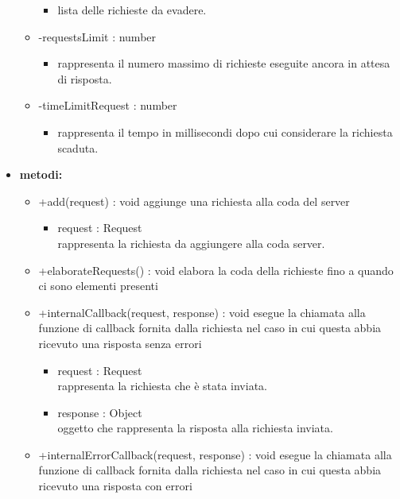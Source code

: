 \begin{itemize}
\begin{itemize}
\begin{itemize}
			\item lista delle richieste da evadere.\end{itemize}
		\item -requestsLimit : number\begin{itemize}
			\item rappresenta il numero massimo di richieste eseguite ancora in attesa di risposta.\end{itemize}
		\item -timeLimitRequest : number\begin{itemize}
			\item rappresenta il tempo in millisecondi dopo cui considerare la richiesta scaduta.\end{itemize}
	\end{itemize}
	\item \textbf{metodi:}
	\begin{itemize}
		\item +add(request) : void\newline
		aggiunge una richiesta alla coda del server
		\begin{itemize}
			\item request : Request\\
			rappresenta la richiesta da aggiungere alla coda server.
		\end{itemize}
		\item +elaborateRequests() : void\newline
		elabora la coda della richieste fino a quando ci sono elementi presenti
		\item +internalCallback(request, response) : void\newline
		esegue la chiamata alla funzione di callback fornita dalla richiesta nel caso in cui questa abbia ricevuto una risposta senza errori
		\begin{itemize}
			\item request : Request\\
			rappresenta la richiesta che è stata inviata.
			\item response : Object\\
			oggetto che rappresenta la risposta alla richiesta inviata.
		\end{itemize}
		\item +internalErrorCallback(request, response) : void\newline
		esegue la chiamata alla funzione di callback fornita dalla richiesta nel caso in cui questa abbia ricevuto una risposta con errori
		\begin{itemize}

\end{itemize}
\end{itemize}
\end{itemize}

